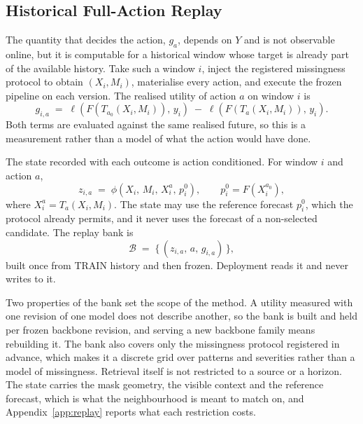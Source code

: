 \documentclass{article}
\newcommand{\calB}{\mathcal{B}}
\newcommand{\loss}{\ell}
\begin{document}
\subsection{Historical Full-Action Replay}
\label{sec:method-replay}
The quantity that decides the action, $g_a$, depends on $Y$ and is not observable online, but it
is computable for a historical window whose target is already part of the available history.
Take such a window $i$, inject the registered missingness protocol to obtain $(X_i, M_i)$,
materialise every action, and execute the frozen pipeline on each version. The realised utility
of action $a$ on window $i$ is
\begin{equation}
  g_{i,a} \;=\; \loss\!\left(F(T_{a_0}(X_i, M_i)),\, y_i\right)
  \;-\; \loss\!\left(F(T_{a}(X_i, M_i)),\, y_i\right).
  \label{eq:replay-gain}
\end{equation}
Both terms are evaluated against the same realised future, so this is a measurement rather
than a model of what the action would have done.

The state recorded with each outcome is action conditioned. For window $i$ and action $a$,
\begin{equation}
  z_{i,a} \;=\; \phi\!\left(X_i,\, M_i,\, X_i^{a},\, p_i^{0}\right),
  \qquad
  p_i^{0} = F(X_i^{a_0}),
  \label{eq:state}
\end{equation}
where $X_i^{a} = T_a(X_i, M_i)$. The state may use the reference forecast $p_i^0$, which the
protocol already permits, and it never uses the forecast of a non-selected candidate. The
replay bank is
\begin{equation}
  \calB \;=\; \bigl\{\, (z_{i,a},\, a,\, g_{i,a}) \,\bigr\},
  \label{eq:replay-bank}
\end{equation}
built once from TRAIN history and then frozen. Deployment reads it and never writes to it.

Two properties of the bank set the scope of the method. A utility measured with one revision
of one model does not describe another, so the bank is built and held per frozen backbone
revision, and serving a new backbone family means rebuilding it. The bank also covers only the
missingness protocol registered in advance, which makes it a discrete grid over patterns and
severities rather than a model of missingness. Retrieval itself is not restricted to a source
or a horizon. The state carries the mask geometry, the visible context and the reference
forecast, which is what the neighbourhood is meant to match on, and
Appendix~\ref{app:replay} reports what each restriction costs.
\end{document}
